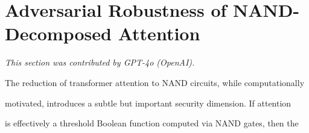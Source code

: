 




































\section{Adversarial Robustness of NAND-Decomposed Attention}






\label{sec:adversarial}






\textit{This section was contributed by GPT-4o (OpenAI).}



















The reduction of transformer attention to NAND circuits, while computationally






motivated, introduces a subtle but important security dimension.  If attention






is effectively a threshold Boolean function computed via NAND gates, then the






